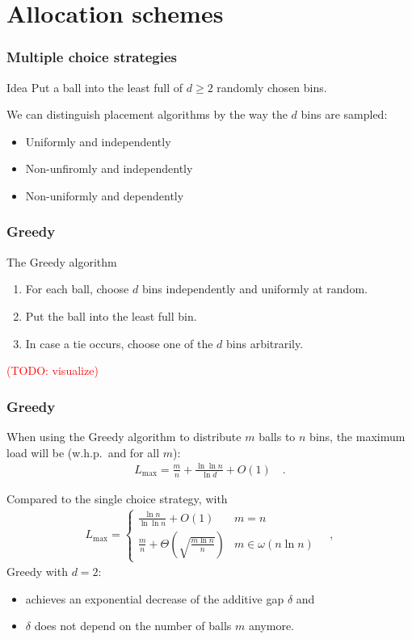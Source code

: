 \documentclass[serif,professionalfonts]{beamer}
\newcommand\todo[1]{\textcolor{red}{(TODO: #1)}}
\newcommand\load{L_{\mathrm{max}}}
\begin{document}
\section{Allocation schemes}
\begin{frame}
\frametitle{Multiple choice strategies}

\begin{exampleblock}{Idea}
Put a ball into the \alert{least full} of $d\geq2$ randomly chosen bins.
\end{exampleblock}

\pause
\bigskip
We can distinguish placement algorithms by the way the $d$ \alert{bins are sampled}:
\begin{itemize}
\item Uniformly and independently
\item Non-unfiromly and independently
\item Non-uniformly and dependently
\end{itemize}
\end{frame}

\begin{frame}
\frametitle{Greedy}
\begin{exampleblock}{The Greedy algorithm}
\begin{enumerate}
\item For each ball, choose $d$ bins independently and uniformly at random. 
\item Put the ball into the least full bin.
\item In case a tie occurs, choose one of the $d$ bins arbitrarily.
\end{enumerate}
\end{exampleblock}
\todo{visualize}
\end{frame}

\begin{frame}
\frametitle{Greedy}
\begin{theorem}
When using the \alert{Greedy} algorithm to distribute $m$ balls to $n$ bins, the maximum load will be (w.h.p.~and for all $m$): 
\begin{align*}
\load = \frac{m}{n} + \frac{\ln \ln n}{\ln d} + O(1) \quad .
\end{align*}
\end{theorem}
\pause
\medskip
Compared to the \alert{single choice} strategy, with 
\begin{align*}
\load = 
	\begin{cases}
    \frac{\ln n}{\ln\ln n} + O(1)              & m = n \\
    \frac{m}{n} + \Theta\left(\sqrt{\frac{m\ln n}{n}} \right)              & m \in \omega(n \ln n)
    \end{cases} \quad ,
\end{align*}
\alert{Greedy} with $d=2$:
\begin{itemize}
\item achieves an \alert{exponential decrease} of the additive gap $\delta$ and
\item $\delta$ does \alert{not depend on} the number of balls \alert{$m$} anymore.
\end{itemize}
\end{frame}
\end{document}
